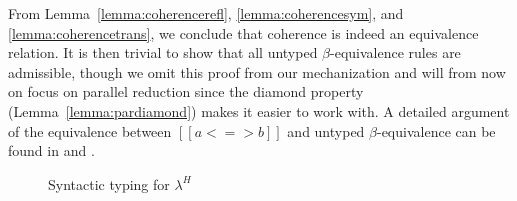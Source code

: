 \documentclass[acmsmall,screen=true,
\ifpublic review=false\else,review=true\fi
  ,anonymous=\ifanonymous true\else false\fi]{acmart}
\newcommand{\lang}{$\lambda^H$\xspace}
\newcommand{\scw}[1]{}
\newcommand{\yl}[1]{}
\begin{document}
From Lemma~\ref{lemma:coherencerefl}, \ref{lemma:coherencesym}, and
\ref{lemma:coherencetrans}, we conclude that coherence is indeed an
equivalence relation. It is then trivial to show that all untyped
$\beta$-equivalence rules are admissible, though we omit this proof
from our mechanization and will from now on focus on parallel
reduction since the diamond property (Lemma~\ref{lemma:pardiamond})
makes it easier to work with. A detailed argument of the equivalence
between $[[a <=> b]]$ and untyped $\beta$-equivalence can be found in
\citet{barendregt:lambda-calculi-with-types} and
\citet{takahashi-parallel-reduction}.

\begin{figure}[h]
\begin{minipage}{0.9\textwidth}
\end{minipage}
\caption{Syntactic typing for \lang}
\label{fig:typing}
\end{figure}







\end{document}
